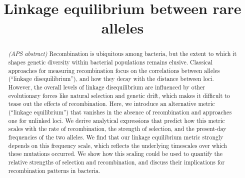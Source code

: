\documentclass[aps,rmp,twocolumn,groupedaddress,floatfix,notitlepage]{revtex4-1}
\begin{document}
\title{Linkage equilibrium between rare alleles} 

\begin{abstract}
\emph{(APS abstract)} Recombination is ubiquitous among bacteria, but the extent to which it shapes genetic diversity within bacterial populations remains elusive. Classical approaches for measuring recombination focus on the correlations between alleles (“linkage disequilibrium”), and how they decay with the distance between loci. However, the overall levels of linkage disequilibrium are influenced by other evolutionary forces like natural selection and genetic drift, which makes it difficult to tease out the effects of recombination. Here, we introduce an alternative metric (“linkage equilibrium”) that vanishes in the absence of recombination and approaches one for unlinked loci. We derive analytical expressions that predict how this metric scales with the rate of recombination, the strength of selection, and the present-day frequencies of the two alleles. We find that our linkage equilibrium metric strongly depends on this frequency scale, which reflects the underlying timescales over which these mutations occurred. We show how this scaling could be used to quantify the relative strengths of selection and recombination, and discuss their implications for recombination patterns in bacteria. 
\end{abstract}

\maketitle


\newpage
\onecolumngrid
\end{document}
